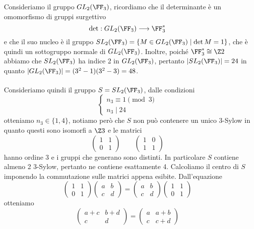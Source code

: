 \documentclass[11pt]{scrartcl}
\begin{document}
Consideriamo il gruppo $GL_2(\FF_3)$, ricordiamo che il determinante è 
un omomorfismo di gruppi surgettivo
\[
    \det: GL_2(\FF_3) \longrightarrow \FF_3^*
\]
e che il suo nucleo è il gruppo $SL_2(\FF_3) = \{M \in GL_2(\FF_3)\mid \det M = 1\}$,
che è quindi un sottogruppo normale di $GL_2(\FF_3)$. Inoltre, poiché
$\FF_3^* \cong \Z2$ abbiamo che $SL_2(\FF_3)$ ha indice 2 in $GL_2(\FF_3)$, pertanto 
$|SL_2(\FF_3)| = 24$ in quanto $|GL_2(\FF_3)| = (3^2 - 1)(3^2 - 3) = 48$.
\\\\
Consideriamo quindi il gruppo $S = SL_2(\FF_3)$, dalle condizioni 
\[
    \begin{cases}
        n_3 \equiv 1 \pmod 3\\
        n_3 \mid 24
    \end{cases}
\]
otteniamo $n_3 \in \{1, 4\}$, notiamo però che $S$ non può contenere un unico 
3-Sylow in quanto questi sono isomorfi a $\Z3$ e le matrici 
\[
    \begin{pmatrix}
        1 & 1\\
        0 & 1
    \end{pmatrix}\qquad
    \begin{pmatrix}
        1 & 0\\
        1 & 1
    \end{pmatrix}
\]
hanno ordine 3 e i gruppi che generano sono distinti. In particolare $S$
contiene almeno 2 3-Sylow, pertanto ne contiene esattamente 4.
Calcoliamo il centro di $S$ imponendo la commutazione sulle matrici appena 
esibite. Dall'equazione 
\[
    \begin{pmatrix}
        1 & 1\\
        0 & 1
    \end{pmatrix}
    \begin{pmatrix}
        a & b\\
        c & d
    \end{pmatrix} = 
    \begin{pmatrix}
        a & b\\
        c & d
    \end{pmatrix}
    \begin{pmatrix}
        1 & 1\\
        0 & 1
    \end{pmatrix}
\]
otteniamo 
\[
    \begin{pmatrix}
        a + c & b + d\\
        c & d
    \end{pmatrix} = 
    \begin{pmatrix}
        a & a + b\\
        c & c + d
    \end{pmatrix}
\]
\end{document}
